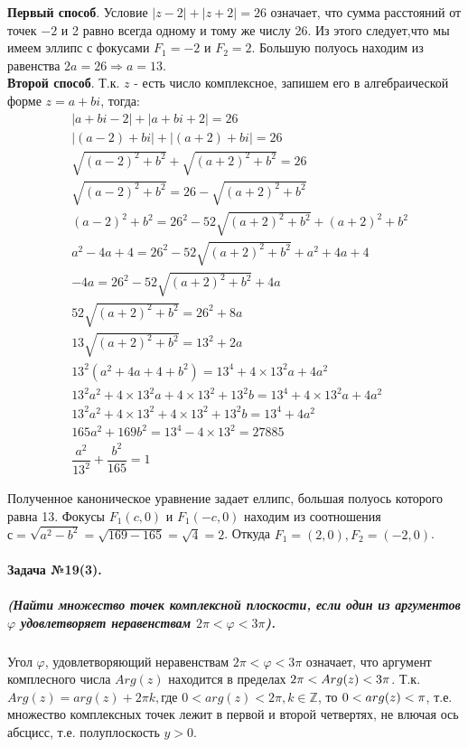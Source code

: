 \documentclass[a4paper,12pt]{report}
\newcommand*{\hm}[1]{#1\nobreak\discretionary{}
{\hbox{$\mathsurround=0pt #1$}}{}}
\begin{document}
\textbf{Первый способ}.
Условие $ |z-2|+|z+2|=26 $ означает, что сумма расстояний от точек
$ -2 $ и 2 равно всегда одному и тому же числу 26. 
Из этого следует,что мы имеем эллипс с фокусами $ F_1=-2 $ и $ F_2=2 $.
Большую полуось находим из равенства $ 2a=26 \Rightarrow a=13 $.\\

\textbf{Второй способ}.
Т.к. $ z $ - есть число комплексное, запишем его в алгебраической форме
$ z=a+bi $, тогда:
\begin{align*}
	&|a+bi-2|+|a+bi+2|=26\\
	&|(a-2)+bi|+|(a+2)+bi|=26\\	
	&\sqrt{(a-2)^2+b^2}+\sqrt{(a+2)^2+b^2}=26\\
	&\sqrt{(a-2)^2+b^2}=26-\sqrt{(a+2)^2+b^2}\\
	&(a-2)^2+b^2=26^2-52\sqrt{(a+2)^2+b^2}+(a+2)^2+b^2\\
	&a^2-4a+4=26^2-52\sqrt{(a+2)^2+b^2}+a^2+4a+4\\
	&-4a=26^2-52\sqrt{(a+2)^2+b^2}+4a\\
	&52\sqrt{(a+2)^2+b^2}=26^2+8a\\
	&13\sqrt{(a+2)^2+b^2}=13^2+2a\\
	&13^2(a^2+4a+4+b^2)=13^4+4\times13^2a+4a^2\\
	&13^2a^2+4\times 13^2a+4\times 13^2+13^2b=13^4+4\times13^2a+4a^2\\
	&13^2a^2+4\times 13^2+4\times 13^2+13^2b=13^4+4a^2\\
	&165a^2+169b^2=13^4-4\times 13^2=27885\\
	&\dfrac{a^2}{13^2}+\dfrac{b^2}{165}=1
\end{align*}
 
Полученное каноническое уравнение задает еллипс, 
большая полуось которого равна 13. 
Фокусы $ F_1(c, 0) $ и $ F_1(-c, 0) $ находим из соотношения
$ с=\sqrt{a^2-b^2}=\sqrt{169-165}=\sqrt{4}=2 $. 
Откуда $ F_1=(2, 0), F_2=(-2, 0) $.

\paragraph{Задача №19(3).}
\subparagraph{(Найти множество точек комплексной плоскости,
если один из аргументов $ \varphi $ удовлетворяет неравенствам 
$ 2\pi<\varphi<3\pi $).\\}

Угол $ \varphi $, удовлетворяющий неравенствам  $ 2\pi<\varphi<3\pi $ 
означает, что аргумент комплесного числа $ Arg(z) $ 
находится в пределах $ 2\pi<Arg(z)\hm<3\pi $. 
Т.к. $ Arg(z)=arg(z) + 2\pi k, \text{где } 0<arg(z)<2\pi, k \in \mathbb{Z}$,
то $ 0\hm<arg(z)<\pi $, т.е. множество комплексных точек лежит в первой и второй
четвертях, не влючая ось абсцисс, т.е. полуплоскость $ y>0 $.
\end{document}

